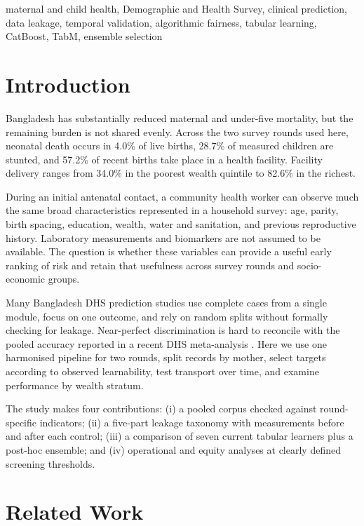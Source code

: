 \documentclass[conference]{IEEEtran}
\begin{document}
\begin{IEEEkeywords}
maternal and child health, Demographic and Health Survey, clinical prediction,
data leakage, temporal validation, algorithmic fairness, tabular learning,
CatBoost, TabM, ensemble selection
\end{IEEEkeywords}

\section{Introduction}

Bangladesh has substantially reduced maternal and under-five mortality, but
the remaining burden is not shared evenly. Across the two survey rounds used
here, neonatal death occurs in 4.0\% of live births, 28.7\% of measured
children are stunted, and 57.2\% of recent births take place in a health
facility. Facility delivery ranges from 34.0\% in the poorest wealth quintile
to 82.6\% in the richest.

During an initial antenatal contact, a community health worker can observe
much the same broad characteristics represented in a household survey: age,
parity, birth spacing, education, wealth, water and sanitation, and previous
reproductive history. Laboratory measurements and biomarkers are not assumed
to be available. The question is whether these variables can provide a useful
early ranking of risk and retain that usefulness across survey rounds and
socio-economic groups.

Many Bangladesh DHS prediction studies use complete cases from a single
module, focus on one outcome, and rely on random splits without formally
checking for leakage. Near-perfect discrimination is hard to reconcile with
the pooled accuracy reported in a recent DHS meta-analysis \cite{rao2025}.
Here we use one harmonised pipeline for two rounds, split records by mother,
select targets according to observed learnability, test transport over time,
and examine performance by wealth stratum.

The study makes four contributions: (i) a pooled corpus checked against
round-specific indicators; (ii) a five-part leakage taxonomy with measurements
before and after each control; (iii) a comparison of seven current tabular
learners plus a post-hoc ensemble; and (iv) operational and equity analyses at
clearly defined screening thresholds.

\section{Related Work}
\end{document}
